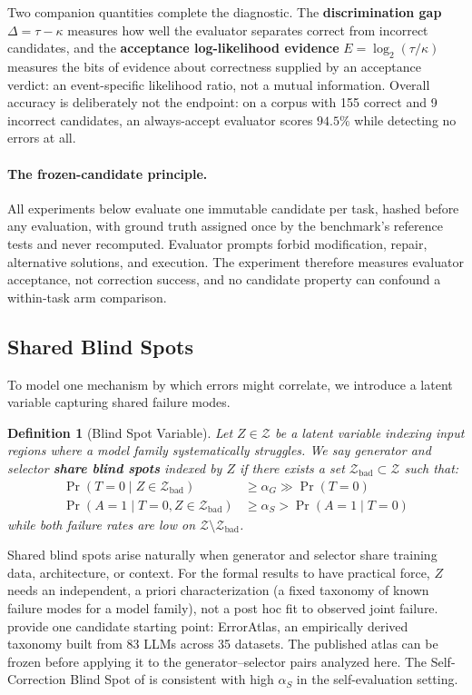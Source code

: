 \documentclass[a4paper,journal]{IAENGtran}
\newtheorem{Definition}[Theorem]{Definition}
\begin{document}
Two companion quantities complete the diagnostic. The \textbf{discrimination gap}
$\Delta=\tau-\kappa$ measures how well the evaluator separates correct from incorrect
candidates, and the \textbf{acceptance log-likelihood evidence}
$E=\log_2(\tau/\kappa)$ measures the bits of evidence about correctness supplied by an
acceptance verdict: an event-specific likelihood ratio, not a mutual information.
Overall accuracy is deliberately not the endpoint: on a corpus with 155 correct and 9
incorrect candidates, an always-accept evaluator scores $94.5\%$ while detecting no
errors at all.

\paragraph{The frozen-candidate principle.} All experiments below evaluate one immutable
candidate per task, hashed before any evaluation, with ground truth assigned once by the
benchmark's reference tests and never recomputed. Evaluator prompts forbid modification,
repair, alternative solutions, and execution. The experiment therefore measures evaluator
acceptance, not correction success, and no candidate property can confound a within-task
arm comparison.

\subsection{Shared Blind Spots}

To model one mechanism by which errors might correlate, we introduce a latent variable
capturing shared failure modes.

\begin{Definition}[Blind Spot Variable]
Let $Z \in \mathcal{Z}$ be a latent variable indexing input regions where a model family
systematically struggles. We say generator and selector \textbf{share blind spots} indexed
by $Z$ if there exists a set $\mathcal{Z}_{\mathrm{bad}} \subset \mathcal{Z}$ such that:
\begin{align}
\Pr(T = 0 \mid Z \in \mathcal{Z}_{\mathrm{bad}}) &\geq \alpha_G \gg \Pr(T = 0) \\
\Pr(A = 1 \mid T = 0, Z \in \mathcal{Z}_{\mathrm{bad}}) &\geq \alpha_S > \Pr(A = 1 \mid T = 0)
\end{align}
while both failure rates are low on $\mathcal{Z} \setminus \mathcal{Z}_{\mathrm{bad}}$.
\end{Definition}

Shared blind spots arise naturally when generator and selector share training data,
architecture, or context. For the formal results to have practical force, $Z$ needs an
independent, a priori characterization (a fixed taxonomy of known failure modes for a
model family), not a post hoc fit to observed joint failure. \cite{erroratlas2026} provide one candidate starting point: ErrorAtlas, an empirically
derived taxonomy built from 83 LLMs across 35 datasets. The published atlas can be
frozen before applying it to the generator--selector pairs analyzed here. The Self-Correction Blind Spot of \cite{tsui2025selfcorrection} is consistent with
high $\alpha_S$ in the self-evaluation setting.
\end{document}
